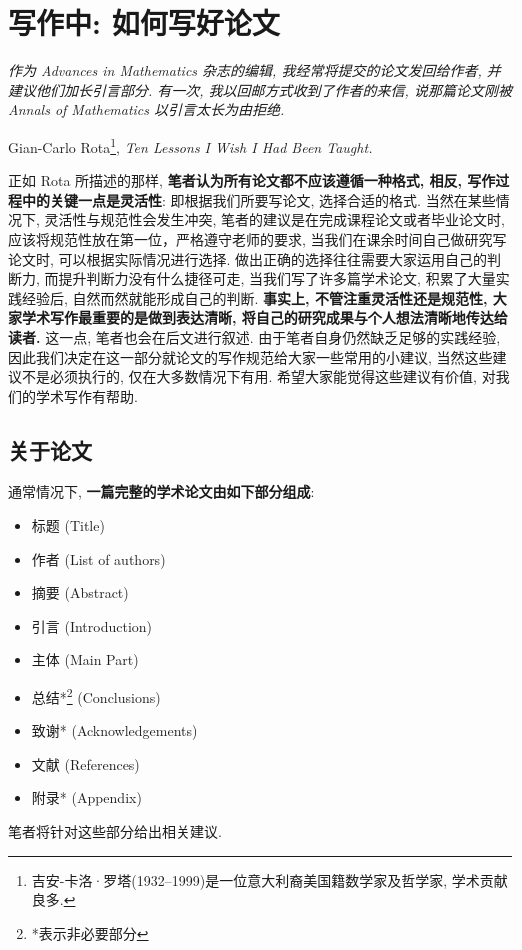 \documentclass{formatBook}
\begin{document}
\section{写作中: 如何写好论文}
\noindent \textit{作为 Advances in Mathematics 杂志的编辑, 我经常将提交的论文发回给作者, 并建议他们加长引言部分. 有一次, 我以回邮方式收到了作者的来信, 说那篇论文刚被 Annals of Mathematics 以引言太长为由拒绝. }
\begin{flushright}
    \cndash Gian-Carlo Rota\footnote{吉安-卡洛·罗塔(1932–1999)是一位意大利裔美国籍数学家及哲学家, 学术贡献良多.}, \textit{Ten Lessons I Wish I Had Been Taught\cite{RotaTen1997}.}
\end{flushright}

正如 Rota 所描述的那样, \textbf{笔者认为所有论文都不应该遵循一种格式, 相反, 写作过程中的关键一点是灵活性}: 即根据我们所要写论文, 选择合适的格式.
当然在某些情况下, 灵活性与规范性会发生冲突, 笔者的建议是在完成课程论文或者毕业论文时, 应该将规范性放在第一位，严格遵守老师的要求, 当我们在课余时间自己做研究写论文时, 可以根据实际情况进行选择.
做出正确的选择往往需要大家运用自己的判断力, 而提升判断力没有什么捷径可走, 当我们写了许多篇学术论文, 积累了大量实践经验后, 自然而然就能形成自己的判断. 
\textbf{事实上, 不管注重灵活性还是规范性, 大家学术写作最重要的是做到表达清晰, 将自己的研究成果与个人想法清晰地传达给读者.} 这一点, 笔者也会在后文进行叙述.
由于笔者自身仍然缺乏足够的实践经验, 因此我们决定在这一部分就论文的写作规范给大家一些常用的小建议, 当然这些建议不是必须执行的, 仅在大多数情况下有用. 希望大家能觉得这些建议有价值, 对我们的学术写作有帮助. 
\subsection{关于论文}
通常情况下, \textbf{一篇完整的学术论文由如下部分组成}: 
\begin{itemize}
    \item 标题 (Title)
    \item 作者 (List of authors)
    \item 摘要 (Abstract)
    \item 引言 (Introduction)
    \item 主体 (Main Part)
    \item 总结*\footnote{*表示非必要部分} (Conclusions)
    \item 致谢* (Acknowledgements)
    \item 文献 (References)
    \item 附录* (Appendix)
\end{itemize}
\par
笔者将针对这些部分给出相关建议. 
\end{document}
